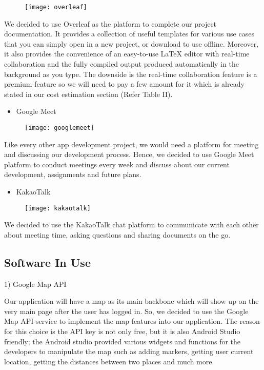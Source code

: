 \documentclass[conference]{IEEEtran}
\begin{document}
\par \begin{figure}[h!]
\texttt{[image: overleaf]}
\centering
\end{figure} We decided to use Overleaf as the platform to complete our project documentation. It provides a collection of useful templates for various use cases that you can simply open in a new project, or download to use offline. Moreover, it also provides the convenience of an easy-to-use LaTeX editor with real-time collaboration and the fully compiled output produced automatically in the background as you type. The downside is the real-time collaboration feature is a premium feature so we will need to pay a few amount for it which is already stated in our cost estimation section (Refer Table II).\\
\begin{itemize}
\item Google Meet
\end{itemize}
\par \begin{figure}[h!]
\texttt{[image: googlemeet]}
\centering
\end{figure} Like every other app development project, we would need a platform for meeting and discussing our development process. Hence, we decided to use Google Meet platform to conduct meetings every week and discuss about our current development, assignments and future plans. \\
\begin{itemize}
\item KakaoTalk
\end{itemize}
\par \begin{figure}[h!]
\texttt{[image: kakaotalk]}
\centering
\end{figure} We decided to use the KakaoTalk chat platform to communicate with each other about meeting time, asking questions and sharing documents on the go. \\

\subsection{Software In Use}

1) Google Map API\\

\par Our application will have a map as its main backbone which will show up on the very main page after the user has logged in. So, we decided to use the Google Map API service to implement the map features into our application. The reason for this choice is the API key is not only free, but it is also Android Studio friendly; the Android studio provided various widgets and functions for the developers to manipulate the map such as adding markers, getting user current location, getting the distances between two places and much more.  \\
\end{document}

